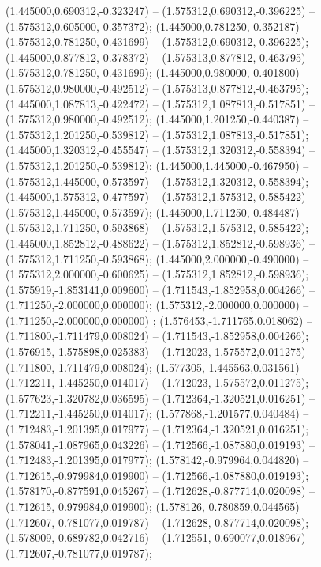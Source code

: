  (1.445000,0.690312,-0.323247) -- (1.575312,0.690312,-0.396225) -- (1.575312,0.605000,-0.357372);
 (1.445000,0.781250,-0.352187) -- (1.575312,0.781250,-0.431699) -- (1.575312,0.690312,-0.396225);
 (1.445000,0.877812,-0.378372) -- (1.575313,0.877812,-0.463795) -- (1.575312,0.781250,-0.431699);
 (1.445000,0.980000,-0.401800) -- (1.575312,0.980000,-0.492512) -- (1.575313,0.877812,-0.463795);
 (1.445000,1.087813,-0.422472) -- (1.575312,1.087813,-0.517851) -- (1.575312,0.980000,-0.492512);
 (1.445000,1.201250,-0.440387) -- (1.575312,1.201250,-0.539812) -- (1.575312,1.087813,-0.517851);
 (1.445000,1.320312,-0.455547) -- (1.575312,1.320312,-0.558394) -- (1.575312,1.201250,-0.539812);
 (1.445000,1.445000,-0.467950) -- (1.575312,1.445000,-0.573597) -- (1.575312,1.320312,-0.558394);
 (1.445000,1.575312,-0.477597) -- (1.575312,1.575312,-0.585422) -- (1.575312,1.445000,-0.573597);
 (1.445000,1.711250,-0.484487) -- (1.575312,1.711250,-0.593868) -- (1.575312,1.575312,-0.585422);
 (1.445000,1.852812,-0.488622) -- (1.575312,1.852812,-0.598936) -- (1.575312,1.711250,-0.593868);
 (1.445000,2.000000,-0.490000) -- (1.575312,2.000000,-0.600625) -- (1.575312,1.852812,-0.598936);
 (1.575919,-1.853141,0.009600) -- (1.711543,-1.852958,0.004266) -- (1.711250,-2.000000,0.000000);
 (1.575312,-2.000000,0.000000) -- (1.711250,-2.000000,0.000000) ;
 (1.576453,-1.711765,0.018062) -- (1.711800,-1.711479,0.008024) -- (1.711543,-1.852958,0.004266);
 (1.576915,-1.575898,0.025383) -- (1.712023,-1.575572,0.011275) -- (1.711800,-1.711479,0.008024);
 (1.577305,-1.445563,0.031561) -- (1.712211,-1.445250,0.014017) -- (1.712023,-1.575572,0.011275);
 (1.577623,-1.320782,0.036595) -- (1.712364,-1.320521,0.016251) -- (1.712211,-1.445250,0.014017);
 (1.577868,-1.201577,0.040484) -- (1.712483,-1.201395,0.017977) -- (1.712364,-1.320521,0.016251);
 (1.578041,-1.087965,0.043226) -- (1.712566,-1.087880,0.019193) -- (1.712483,-1.201395,0.017977);
 (1.578142,-0.979964,0.044820) -- (1.712615,-0.979984,0.019900) -- (1.712566,-1.087880,0.019193);
 (1.578170,-0.877591,0.045267) -- (1.712628,-0.877714,0.020098) -- (1.712615,-0.979984,0.019900);
 (1.578126,-0.780859,0.044565) -- (1.712607,-0.781077,0.019787) -- (1.712628,-0.877714,0.020098);
 (1.578009,-0.689782,0.042716) -- (1.712551,-0.690077,0.018967) -- (1.712607,-0.781077,0.019787);
